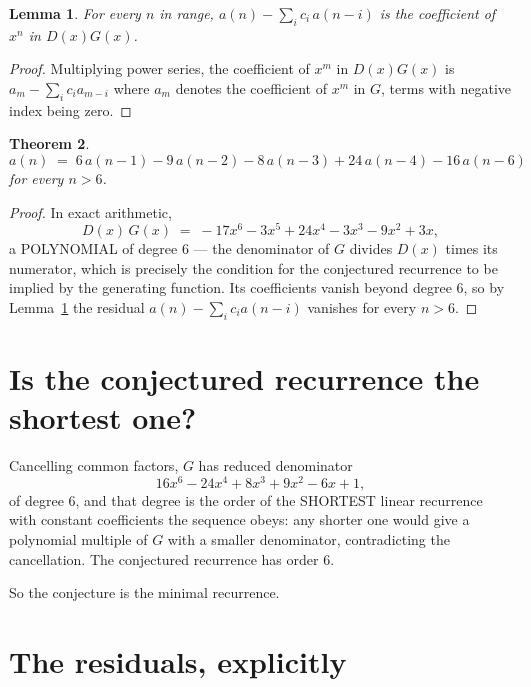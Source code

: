 \documentclass[11pt,a4paper]{article}
\theoremstyle{plain}
\newtheorem{theorem}{Theorem}
\newtheorem{lemma}[theorem]{Lemma}
\theoremstyle{definition}
\begin{document}
\begin{lemma}\label{lem:key}
For every $n$ in range, $a(n)-\sum_i c_i\,a(n-i)$ is the coefficient of $x^{n}$ in
$D(x)G(x)$.
\end{lemma}

\begin{proof}
Multiplying power series, the coefficient of $x^{m}$ in $D(x)G(x)$ is
$a_m-\sum_i c_i a_{m-i}$ where $a_m$ denotes the coefficient of $x^{m}$ in $G$, terms with
negative index being zero.
\end{proof}

\begin{theorem}
\[
a(n)\;=\;6\,a(n-1) - 9\,a(n-2) - 8\,a(n-3) + 24\,a(n-4) - 16\,a(n-6)
\]
for every $n>6$.
\end{theorem}

\begin{proof}
In exact arithmetic,
\[
D(x)\,G(x)\;=\;- 17 x^{6} - 3 x^{5} + 24 x^{4} - 3 x^{3} - 9 x^{2} + 3 x,
\]
a POLYNOMIAL of degree $6$ --- the denominator of $G$ divides $D(x)$ times its numerator,
which is precisely the condition for the conjectured recurrence to be implied by the
generating function. Its coefficients vanish beyond degree $6$, so by
Lemma~\ref{lem:key} the residual $a(n)-\sum_ic_ia(n-i)$ vanishes for every
$n>6$.
\end{proof}

\section{Is the conjectured recurrence the shortest one?}

Cancelling common factors, $G$ has reduced denominator
\[
16 x^{6} - 24 x^{4} + 8 x^{3} + 9 x^{2} - 6 x + 1,
\]
of degree $6$, and that degree is the order of the SHORTEST linear recurrence with
constant coefficients the sequence obeys: any shorter one would give a polynomial multiple of
$G$ with a smaller denominator, contradicting the cancellation. The conjectured recurrence has
order $6$.

So the conjecture is the minimal recurrence.

\section{The residuals, explicitly}
\end{document}
